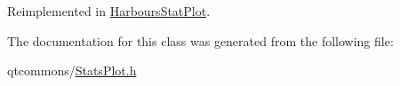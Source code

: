 Reimplemented in \mbox{\hyperlink{class_harbours_stat_plot_a98ae9cd6fbf5089f6fc7edabf2912606}{Harbours\+Stat\+Plot}}.



The documentation for this class was generated from the following file\+:\begin{DoxyCompactItemize}
\item 
qtcommons/\mbox{\hyperlink{_stats_plot_8h}{Stats\+Plot.\+h}}\end{DoxyCompactItemize}
